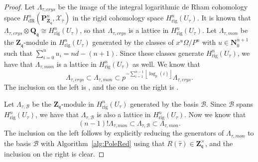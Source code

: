 \documentclass[a4paper,11pt]{article}
\numberwithin{equation}{section}
\providecommand{\floor}[1]{\left\lfloor#1\right\rfloor}   %
\newcommand{\NN}{\mathbf{N}} %
\newcommand{\ZZ}{\mathbf{Z}} %
\newcommand{\QQ}{\mathbf{Q}} %
\providecommand{\HdR}{H_{\text{dR}}}    %
\providecommand{\Hrig}{H_{\text{rig}}}  %
\providecommand{\cB}{\mathcal{B}} %
\theoremstyle{definition}
\begin{document}
\begin{proof}
Let $\Lambda_{\tau, crys}$ be the image of the integral logarithmic de Rham 
cohomology space $\HdR^n(\mathbf{P}_{\mathbf{Z}_{\mathfrak{q}}}^n,\mathcal{X}_{\hat{\tau}})$ 
in the rigid cohomology space $\Hrig^n(U_{\tau})$. It is known that
$\Lambda_{\tau, crys} \otimes \QQ_{\mathfrak{q}} \cong \Hrig^n(U_{\tau})$, 
so that $\Lambda_{\tau, crys}$ is a lattice in $\Hrig^n(U_{\tau})$.  Let 
$\Lambda_{\tau, mon}$ be the $\ZZ_{\mathfrak{q}}$-module in $\Hrig^n(U_{\tau})$ 
generated by the classes of $x^u \Omega/P^n$ with $u \in \NN_0^{n+1}$ such that 
$\sum_{i=0}^n u_i = nd-(n+1)$. Since these classes generate $\Hrig^n(U_{\tau})$, we have 
that $\Lambda_{\tau,mon}$ is a lattice in $\Hrig^n(U_{\tau})$ as well. We know 
that
\[
\Lambda_{\tau,crys} \subset \Lambda_{\tau,mon} \subset p^{-\sum_{i=1}^{n-1} \floor{\log_p(i)}} \Lambda_{\tau,crys}.
\]
The inclusion on the left is \citep[Lemma 3.4.3]{AbbottKedlayaRoe2006}, and the 
one on the right is \citep[Proposition 3.4.6]{AbbottKedlayaRoe2006}.

Let $\Lambda_{\tau,\cB}$ be the $\ZZ_{\mathfrak{q}}$-module in $\Hrig^n(U_{\tau})$ 
generated by the basis $\cB$. Since $\cB$ spans $\Hrig^n(U_{\tau})$, we have that 
$\Lambda_{\tau,\cB}$ is also a lattice in $\Hrig^n(U_{\tau})$. Now we know that
\[
(n-1)! \Lambda_{\tau,mon} \subset \Lambda_{\tau,\cB} \subset \Lambda_{\tau,mon}. 
\]
The inclusion on the left follows by explicitly reducing the generators of 
$\Lambda_{\tau,mon}$ to the basis $\cB$ with Algorithm~\ref{alg:PoleRed} using 
that $R(\hat{\tau}) \in \ZZ_{\mathfrak{q}}^{\times}$, and the inclusion on the right is clear.


\end{proof}
\end{document}
